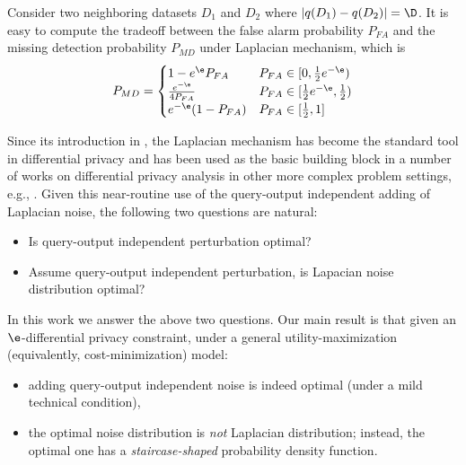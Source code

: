 Consider two neighboring datasets $D_1$ and $D_2$ where $|q(D_1) - q(D_2)| = \D$. It is easy to compute the tradeoff between the false alarm probability $P_{FA}$ and the missing detection probability $P_{MD}$  under  Laplacian mechanism, which is
\begin{align}
P_{MD}  =
\begin{cases}
1 - e^{\e}P_{FA} & P_{FA} \in [0,   \frac{1}{2} e^{-\e}) \\
\frac{e^{-\e}}{4P_{FA}}  & P_{FA} \in [ \frac{1}{2} e^{-\e}, \frac{1}{2} ) \\
e^{-\e}(1 - P_{FA} ) & P_{FA} \in [\frac{1}{2}, 1]
\end{cases}\label{eqn:regionLap}
\end{align}










Since its introduction in \cite{DMNS06},  the Laplacian mechanism has become the standard tool in differential privacy and has been used as the basic building block in a number of works on differential privacy analysis in other more complex problem settings, e.g., \cite{HLM12, MM09, Xiao11, Huang12, McSherry10, Li10, Barak07, DKMMN06, DL09, Roth10, LO11, Smith2011, CM08, continual, Ding11, Hardt2010, Geo12, Ka11, Mironov12bit, Sarathy2011, Xiao2011ireduct, Dankar12, Friedman10, zhang2012functional, lei2011differentially, wasserman2010, dwork2010pan, Guptadp2010, blum2011fast, hsu2012distributed, hsu2012dp, blocki2012johnson, hardt2012beyond, hardt2012private, gupta2012iterative, kasi13, karwa2011private, cormode2012differentially}. Given this near-routine use of the query-output independent adding of Laplacian noise,  the following two questions are natural:
\begin{itemize}
	\item Is  query-output independent perturbation optimal?
	\item Assume query-output independent perturbation,  is Lapacian noise distribution optimal?
\end{itemize}

In this work we answer the above two questions. Our main result is that given an $\e$-differential privacy constraint, under a general utility-maximization (equivalently, cost-minimization) model:
\begin{itemize}
	\item adding query-output independent noise is indeed optimal (under a mild technical condition),
	\item the optimal noise distribution is {\em not} Laplacian distribution; instead, the optimal one has a {\em staircase-shaped} probability density function.
\end{itemize}

